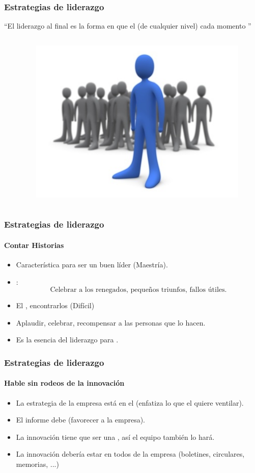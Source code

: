 \frame
{
\frametitle{Estrategias de liderazgo}
\vspace{1cm}
\begin{center}
	``El liderazgo al final es  la forma
		en que el  (de cualquier nivel) 
		cada momento ''
\end{center}
\begin{columns}
\begin{column}{0.6\textwidth}
\end{column}
\begin{column}{0.4\textwidth}
	\includegraphics[width=0.9\textwidth]{img/liderazgo}
\end{column}
\end{columns}
}

\frame
{
\frametitle{Estrategias de liderazgo}
\framesubtitle{Contar Historias}
\begin{itemize}
	\item Característica  para ser un buen líder (Maestría).
	\item {}:
		$$ \text{Celebrar a los renegados, pequeños triunfos, fallos útiles.}$$
	\item El , encontrarlos (Difícil)
	\item Aplaudir, celebrar, recompensar a las personas que lo hacen.
	\item Es la esencia del liderazgo para . 
\end{itemize}
}

\frame
{
\frametitle{Estrategias de liderazgo}
\framesubtitle{Hable sin rodeos de la innovación}
\begin{itemize}
	\item La estrategia de la empresa está en el  (enfatiza lo que el  quiere ventilar).
	\item El informe debe  (favorecer a la empresa).
	\item La innovación tiene que ser una , así el equipo también lo hará.
	\item La innovación debería estar en todos  de la empresa (boletines, circulares, memorias, ...)
\end{itemize}
}

